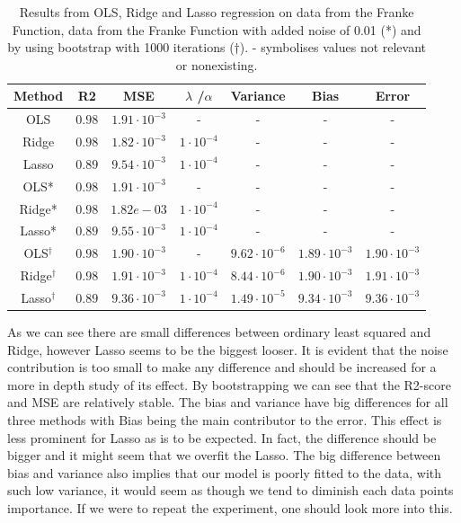 \documentclass[12pt]{article}
\newcommand{\E}[1]{\cdot 10^{#1}}
\begin{document}
\begin{table}[H]
\centering
\begin{tabular}{c|c|c|c|c|c|c}
Method & R2 & MSE & $\lambda$ /$\alpha$ & Variance & Bias & Error \\ \hline
OLS & $0.98$ & $1.91\E{-3}$ & -  & - & - & -  \\ \hline
Ridge & $0.98$ & $1.82\E{-3}$ & $1\E{-4}$ & - & - & -  \\ \hline
Lasso & $0.89$ & $9.54\E{-3}$ & $1\E{-4}$ & - & - & -  \\ \hline
OLS* & $0.98$ & $1.91\E{-3}$ & - & - & - & -  \\ \hline
Ridge* &  $0.98$ & $1.82e-03$ & $1\E{-4}$ & - & - & -  \\ \hline
Lasso* &$0.89$ & $9.55\E{-3}$ & $1\E{-4}$ & - & - & -  \\ \hline
OLS$^{\dagger}$ & $0.98$ & $1.90\E{-3}$ & - & $9.62\E{-6}$ & $1.89\E{-3}$ & $1.90\E{-3}$ \\ \hline
Ridge$^{\dagger}$ & $0.98$ & $1.91\E{-3}$ & $1\E{-4}$ & $8.44\E{-6}$ & $1.90\E{-3}$ & $1.91\E{-3}$  \\ \hline
Lasso$^{\dagger}$ & $0.89$ & $9.36\E{-3}$ & $1\E{-4}$ & $1.49\E{-5}$ & $9.34\E{-3}$ & $9.36\E{-3}$   \\ \hline
\end{tabular}
\caption{Results from OLS, Ridge and Lasso regression on data from the Franke Function, data from the Franke Function with added noise of 0.01 (*) and by using bootstrap with 1000 iterations ($\dagger$). - symbolises values not relevant or nonexisting.}
\label{tabRD:abc}
\end{table}
As we can see there are small differences between ordinary least squared and Ridge, however Lasso seems to be the biggest looser. It is evident that the noise contribution is too small to make any difference and should be increased for a more in depth study of its effect. By bootstrapping we can see that the R2-score and MSE are relatively stable. The bias and variance have big differences for all three methods with Bias being the main contributor to the error. This effect is less prominent for Lasso as is to be expected. In fact, the difference should be bigger and it might seem that we overfit the Lasso. The big difference between bias and variance also implies that our model is poorly fitted to the data, with such low variance, it would seem as though we tend to diminish each data points importance. If we were to repeat the experiment, one should look more into this. \\ 
\end{document}
